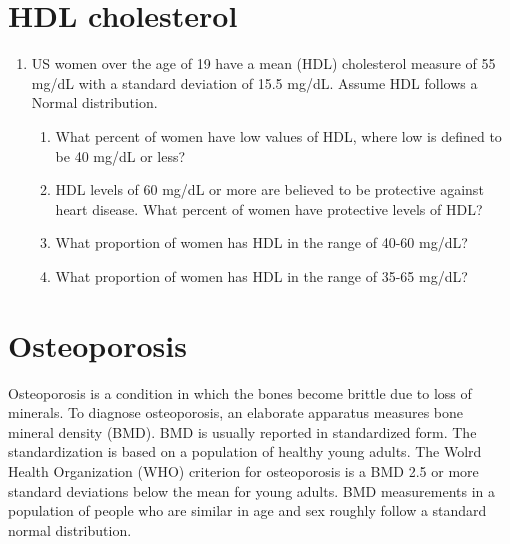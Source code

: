 \documentclass[letterpaper,12pt,twoside,]{pinp}
\providecommand{\tightlist}{%
  \setlength{\itemsep}{0pt}\setlength{\parskip}{0pt}}
\begin{document}
\hypertarget{hdl-cholesterol}{%
\section{HDL cholesterol}\label{hdl-cholesterol}}

\begin{enumerate}
\def\labelenumi{\alph{enumi}.}
\tightlist
\item
  US women over the age of 19 have a mean (HDL) cholesterol measure of
  55 mg/dL with a standard deviation of 15.5 mg/dL. Assume HDL follows a
  Normal distribution.

  \begin{enumerate}
  \def\labelenumii{\roman{enumii}.}
  \tightlist
  \item
    What percent of women have low values of HDL, where low is defined
    to be 40 mg/dL or less?
  \item
    HDL levels of 60 mg/dL or more are believed to be protective against
    heart disease. What percent of women have protective levels of HDL?
  \item
    What proportion of women has HDL in the range of 40-60 mg/dL?
  \item
    What proportion of women has HDL in the range of 35-65 mg/dL?
  \end{enumerate}
\end{enumerate}

\hypertarget{osteoporosis}{%
\section{Osteoporosis}\label{osteoporosis}}

Osteoporosis is a condition in which the bones become brittle due to
loss of minerals. To diagnose osteoporosis, an elaborate apparatus
measures bone mineral density (BMD). BMD is usually reported in
standardized form. The standardization is based on a population of
healthy young adults. The Wolrd Health Organization (WHO) criterion for
osteoporosis is a BMD 2.5 or more standard deviations below the mean for
young adults. BMD measurements in a population of people who are similar
in age and sex roughly follow a standard normal distribution.
\end{document}
